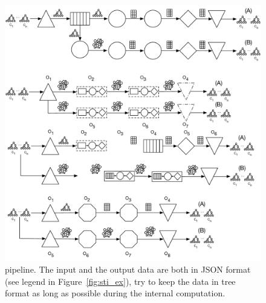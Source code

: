 \begin{figure}[ht]
\centering
\includegraphics[width=\textwidth]{img/comp-mod-natron-pipeline}
\caption{\sti{} pipeline. The input and the output data are both in JSON format (see legend in Figure~\ref{fig:sti_ex}), \sti{} try to keep the data in tree format as long as possible during the internal computation.}
\label{fig:natron-pl}
\end{figure}

